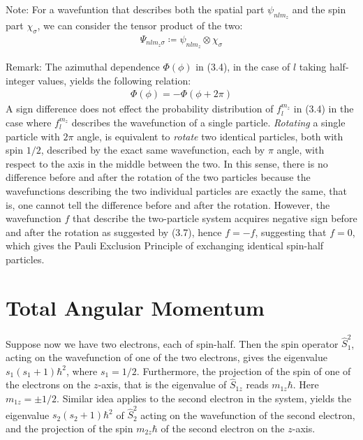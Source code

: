 \documentclass[11pt]{book}
\theoremstyle{break}
\theoremstyle{break}
\newcommand{\note}{\color{red}Note: \color{black}}
\newcommand{\remark}{\color{blue}Remark: \color{black}}
\begin{document}
\note 
For a wavefuntion that describes both the spatial part $\psi_{nlm_z}$ and the spin part $\chi_\sigma$, we can consider the tensor product of the two:
\begin{align*}
\Psi_{nlm_z\sigma} \coloneqq \psi_{nlm_z} \otimes \chi_{\sigma}
\end{align*}

\remark The azimuthal dependence $\Phi(\phi)$ in (3.4), in the case of $l$ taking half-integer values, yields the following relation:
\begin{align}
\Phi(\phi)  = - \Phi(\phi + 2\pi)
\end{align}
A sign difference does not effect the probability distribution of $f_{l}^{m_z}$ in (3.4) in the case where $f_l^{m_z}$ describes the wavefunction of a single particle. \textit{Rotating} a single particle with $2\pi$ angle, is equivalent to \textit{rotate} two identical particles, both with spin $1/2$, described by the exact same wavefunction, each by $\pi$ angle, with respect to the axis in the middle between the two. In this sense, there is no difference before and after the rotation of the two particles because the wavefunctions describing the two individual particles are exactly the same, that is, one cannot tell the difference before and after the rotation. However, the wavefunction $f$ that describe the two-particle system acquires negative sign before and after the rotation as suggested by (3.7), hence $f = -f$, suggesting that $f = 0$, which gives the Pauli Exclusion Principle of exchanging identical spin-half particles. 
\newpage

\section[Total Angular Momentum]{\color{red}Total Angular Momentum\color{black}}
Suppose now we have two electrons, each of spin-half. Then the spin operator $\hat{S}_1^2$, acting on the wavefunction of one of the two electrons, gives the eigenvalue $s_1(s_1+1) \hbar^2$, where $s_1 = 1/2$. Furthermore, the projection of the spin of one of the electrons on the $z$-axis, that is the eigenvalue of $\hat{S}_{1z}$ reads $m_{1z}\hbar$. Here $m_{1z} = \pm 1/2$. Similar idea applies to the second electron in the system, yields the eigenvalue $s_2(s_2 + 1) \hbar^2$ of $\hat{S}^2_2$ acting on the wavefunction of the second electron, and the projection of the spin $m_{2z}\hbar$ of the second electron on the $z$-axis.\\
\end{document}
